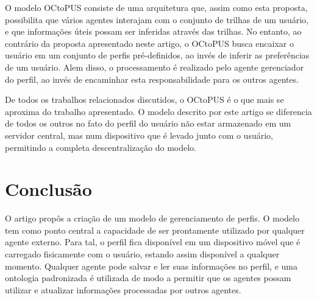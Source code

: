 \documentclass[a4paper, twocolumn]{article}
\begin{document}

O modelo OCtoPUS \cite{silva09} consiste de uma arquitetura que, assim como esta proposta, possibilita que vários agentes interajam com o conjunto de trilhas de um usuário, e que informações úteis possam ser inferidas através das trilhas. No entanto, ao contrário da proposta apresentado neste artigo, o OCtoPUS busca encaixar o usuário em um conjunto de perfis pré-definidos, ao invés de inferir as preferências de um usuário. Alem disso, o processamento é realizado pelo agente gerenciador do perfil, ao invés de encaminhar esta responsabilidade para os outros agentes.


De todos os trabalhos relacionados discutidos, o OCtoPUS é o que mais se aproxima do trabalho apresentado. O modelo descrito por este artigo se diferencia de todos os outros no fato do perfil do usuário não estar armazenado em um servidor central, mas num dispositivo que é levado junto com o usuário, permitindo a completa descentralização do modelo. 



\section{Conclusão} \label{sec:conclusao}

O artigo propôs a criação de um modelo de gerenciamento de perfis. O modelo tem como ponto central a capacidade de ser prontamente utilizado por qualquer agente externo. Para tal, o perfil fica disponível em um dispositivo móvel que é carregado fisicamente com o usuário, estando assim disponível a qualquer momento. Qualquer agente pode salvar e ler suas informações no perfil, e uma ontologia padronizada é utilizada de modo a permitir que os agentes possam utilizar e atualizar informações processadas por outros agentes.
\end{document}
